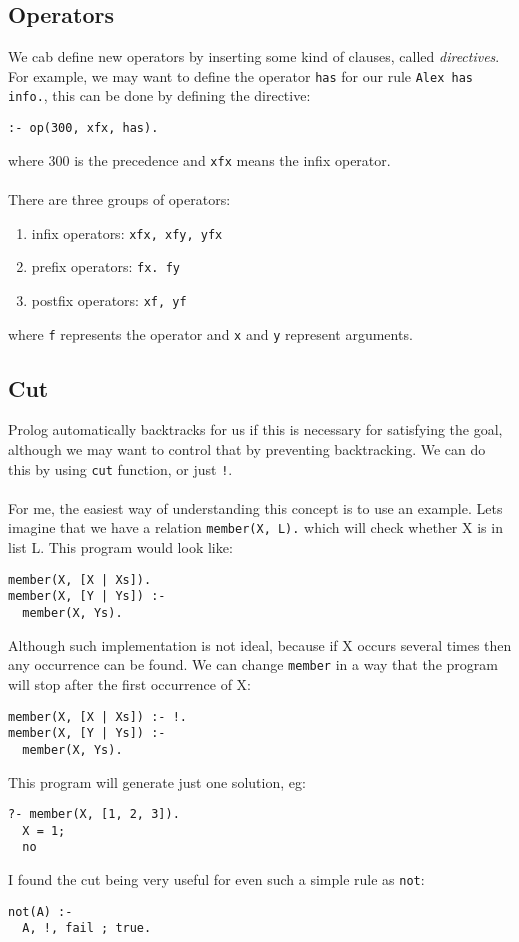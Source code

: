 \documentclass[11pt]{article}
\begin{document}
\subsection{Operators}
We cab define new operators by inserting some kind of clauses, called \emph{directives}. For example, we may want to define the operator \texttt{has} for our rule \texttt{Alex has info.},
this can be done by defining the directive:
\begin{lstlisting}
:- op(300, xfx, has).
\end{lstlisting}
where 300 is the precedence and \texttt{xfx} means the infix operator.\\\\
There are three groups of operators:
\begin{enumerate}
\item infix operators: \texttt{xfx, xfy, yfx}
\item prefix operators: \texttt{fx. fy}
\item postfix operators: \texttt{xf, yf}
\end{enumerate}
where \texttt{f} represents the operator and \texttt{x} and \texttt{y} represent arguments.

\subsection{Cut}
Prolog automatically backtracks for us if this is necessary for satisfying the goal, although we may want to control that by preventing backtracking. We can do this by using \texttt{cut} function, or just \texttt{!}.\\\\
For me, the easiest way of understanding this concept is to use an example. Lets imagine that we have a relation \texttt{member(X, L).} which will check whether X is in list L. This program would look like:
\begin{lstlisting}
member(X, [X | Xs]).
member(X, [Y | Ys]) :-
  member(X, Ys).
\end{lstlisting}
Although such implementation is not ideal, because if X occurs several times then any occurrence can be found. We can change \texttt{member} in a way that the program will stop after the first occurrence of X:
\begin{lstlisting}
member(X, [X | Xs]) :- !.
member(X, [Y | Ys]) :-
  member(X, Ys).
\end{lstlisting}
This program will generate just one solution, eg:
\begin{lstlisting}
?- member(X, [1, 2, 3]).
  X = 1;
  no
\end{lstlisting}
I found the cut being very useful for even such a simple rule as \texttt{not}:
\begin{lstlisting}
not(A) :-
  A, !, fail ; true.
\end{lstlisting}
\end{document}

